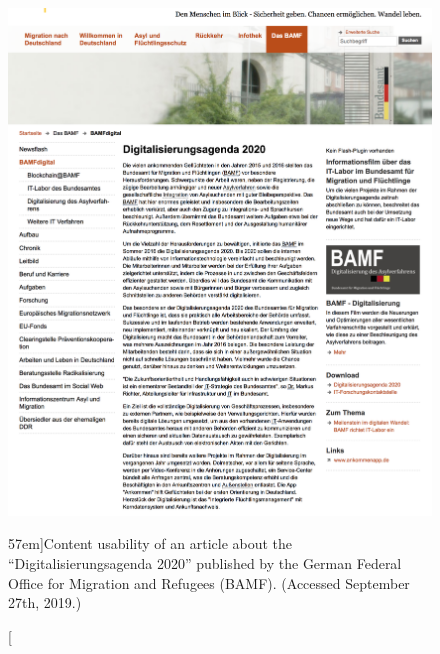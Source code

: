 \newpage
\begin{figure}[!h] %
  \includegraphics[width=1.54\textwidth]{../figures/content_usability_bamf.png}
  \caption[][57em]{Content usability of an article about the ``Digitalisierungsagenda 2020'' published by the German Federal Office for Migration and Refugees (BAMF). (Accessed September 27th, 2019.) }
  \label{fig:content_usability_bamf}
\end{figure}

